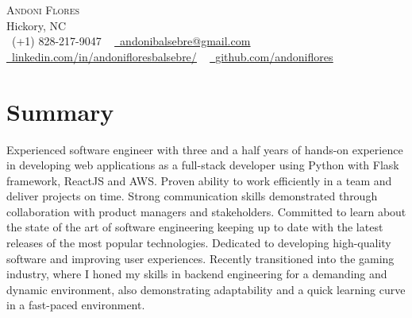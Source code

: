 \documentclass[letterpaper,11pt]{article}
\newcommand{\resumeSubHeadingListStart}{\begin{itemize}[leftmargin=0.0in, label={}]}
\newcommand{\resumeSubHeadingListEnd}{\end{itemize}}
\begin{document}

\begin{center}
    {\Huge \scshape Andoni Flores} \\ \vspace{1pt}
    Hickory, NC \\ \vspace{1pt}
    \small \raisebox{-0.1\height}\faPhone\ (+1) 828-217-9047 ~ \href{mailto:andonibalsebre@gmail.com}{\raisebox{-0.2\height}\faEnvelope\  \underline{andonibalsebre@gmail.com}} ~ 
    \href{https://linkedin.com/in/andonifloresbalsebre/}{\raisebox{-0.2\height}\faLinkedin\ \underline{linkedin.com/in/andonifloresbalsebre/}}  ~
    \href{https://github.com/andoniflores}{\raisebox{-0.2\height}\faGithub\ \underline{github.com/andoniflores}}
    \vspace{-8pt}
\end{center}

%
\section{Summary}
  \resumeSubHeadingListStart
    \small{\item{Experienced software engineer with three and a half years of hands-on experience
        in developing web applications as a full-stack developer using Python with Flask
        framework, ReactJS and AWS. Proven ability to work efficiently in a team and deliver
        projects on time. Strong communication skills demonstrated through collaboration with
        product managers and stakeholders. Committed to learn about the state of the art of software 
        engineering keeping up to date with the latest releases of the most popular technologies. 
        Dedicated to developing high-quality software and improving user experiences.
        Recently transitioned into the gaming industry, where I honed my skills in backend engineering 
        for a demanding and dynamic environment, also demonstrating adaptability and a quick learning 
        curve in a fast-paced environment.}}
  \resumeSubHeadingListEnd
\end{document}
